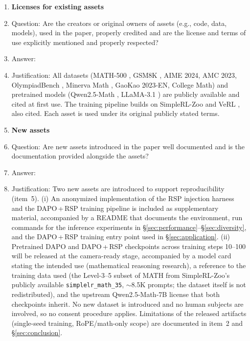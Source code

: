 \begin{enumerate}
\item {\bf Licenses for existing assets}
    \item[] Question: Are the creators or original owners of assets (e.g., code, data, models), used in the paper, properly credited and are the license and terms of use explicitly mentioned and properly respected?
    \item[] Answer: \answerYes{}
    \item[] Justification: All datasets (MATH-500 \citep{lightman2024lets}, GSM8K \citep{cobbe2021training}, AIME 2024, AMC 2023, OlympiadBench \citep{he2024olympiad}, Minerva Math \citep{lewkowycz2022minerva}, GaoKao 2023-EN, College Math) and pretrained models (Qwen2.5-Math \citep{yang2024qwen25math}, LLaMA-3.1 \citep{grattafiori2024llama}) are publicly available and cited at first use. The training pipeline builds on SimpleRL-Zoo \citep{zeng2025simplerl} and VeRL \citep{sheng2024hybridflow}, also cited. Each asset is used under its original publicly stated terms.

\item {\bf New assets}
    \item[] Question: Are new assets introduced in the paper well documented and is the documentation provided alongside the assets?
    \item[] Answer: \answerYes{}
    \item[] Justification: Two new assets are introduced to support reproducibility (item~5). (i) An anonymized implementation of the RSP injection harness and the DAPO\,+\,RSP training pipeline is included as supplementary material, accompanied by a README that documents the environment, run commands for the inference experiments in \S\ref{sec:performance}--\S\ref{sec:diversity}, and the DAPO\,+\,RSP training entry point used in \S\ref{sec:application}. (ii) Pretrained DAPO and DAPO\,+\,RSP checkpoints across training steps 10--100 will be released at the camera-ready stage, accompanied by a model card stating the intended use (mathematical reasoning research), a reference to the training data used (the Level-3--5 subset of MATH from SimpleRL-Zoo's publicly available \texttt{simplelr\_math\_35}, $\sim$8.5K prompts; the dataset itself is not redistributed), and the upstream Qwen2.5-Math-7B \citep{yang2024qwen25math} license that both checkpoints inherit. No new dataset is introduced and no human subjects are involved, so no consent procedure applies. Limitations of the released artifacts (single-seed training, RoPE/math-only scope) are documented in item~2 and \S\ref{sec:conclusion}.


\end{enumerate}
